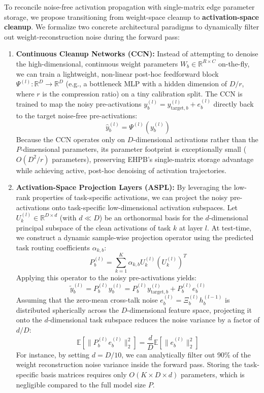 \documentclass{article}
\theoremstyle{plain}
\theoremstyle{definition}
\theoremstyle{remark}
\begin{document}
To reconcile noise-free activation propagation with single-matrix edge parameter storage, we propose transitioning from weight-space cleanup to \textbf{activation-space cleanup}. We formalize two concrete architectural paradigms to dynamically filter out weight-reconstruction noise during the forward pass:
\begin{enumerate}
\item \textbf{Continuous Cleanup Networks (CCN):} Instead of attempting to denoise the high-dimensional, continuous weight parameters $W_b \in \mathbb{R}^{R \times C}$ on-the-fly, we can train a lightweight, non-linear post-hoc feedforward block $\Psi^{(l)}: \mathbb{R}^D \to \mathbb{R}^D$ (e.g., a bottleneck MLP with a hidden dimension of $D/r$, where $r$ is the compression ratio) on a tiny calibration split. The CCN is trained to map the noisy pre-activations $y_b^{(l)} = y_{\text{target}, b}^{(l)} + e_b^{(l)}$ directly back to the target noise-free pre-activations:
\begin{equation}
\hat{y}_b^{(l)} = \Psi^{(l)}\left( y_b^{(l)} \right)
\end{equation}
Because the CCN operates only on $D$-dimensional activations rather than the $P$-dimensional parameters, its parameter footprint is exceptionally small ($O(D^2/r)$ parameters), preserving EHPB's single-matrix storage advantage while achieving active, post-hoc denoising of activation trajectories.
\item \textbf{Activation-Space Projection Layers (ASPL):} By leveraging the low-rank properties of task-specific activations, we can project the noisy pre-activations onto task-specific low-dimensional activation subspaces. Let $U_k^{(l)} \in \mathbb{R}^{D \times d}$ (with $d \ll D$) be an orthonormal basis for the $d$-dimensional principal subspace of the clean activations of task $k$ at layer $l$. At test-time, we construct a dynamic sample-wise projection operator using the predicted task routing coefficients $\alpha_{k, b}$:
\begin{equation}
P_b^{(l)} = \sum_{k=1}^K \alpha_{k, b} U_k^{(l)} \left( U_k^{(l)} \right)^T
\end{equation}
Applying this operator to the noisy pre-activations yields:
\begin{equation}
\tilde{y}_b^{(l)} = P_b^{(l)} y_b^{(l)} = P_b^{(l)} y_{\text{target}, b}^{(l)} + P_b^{(l)} e_b^{(l)}
\end{equation}
Assuming that the zero-mean cross-talk noise $e_b^{(l)} = \Xi_b^{(l)} h_b^{(l-1)}$ is distributed spherically across the $D$-dimensional feature space, projecting it onto the $d$-dimensional task subspace reduces the noise variance by a factor of $d/D$:
\begin{equation}
\mathbb{E}\left[ \|P_b^{(l)} e_b^{(l)}\|_2^2 \right] = \frac{d}{D} \mathbb{E}\left[ \|e_b^{(l)}\|_2^2 \right]
\end{equation}
For instance, by setting $d = D/10$, we can analytically filter out 90\% of the weight reconstruction noise variance inside the forward pass. Storing the task-specific basis matrices requires only $O(K \times D \times d)$ parameters, which is negligible compared to the full model size $P$.
\end{enumerate}
\end{document}

